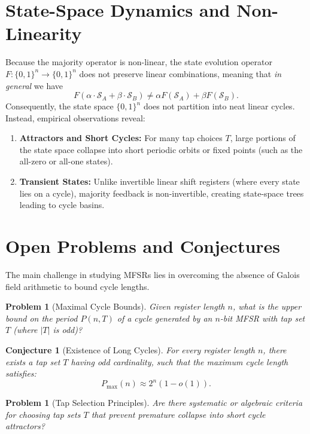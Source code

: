 \documentclass[11pt,reqno]{amsart}
\newtheorem{conjecture}[theorem]{Conjecture}
\newtheorem{problem}[theorem]{Problem}
\theoremstyle{definition}
\begin{document}
\section{State-Space Dynamics and Non-Linearity}

Because the majority operator is non-linear, the state evolution 
operator $F \colon \{0, 1\}^n \to \{0, 1\}^n$ does not 
preserve linear combinations, meaning that {\sl in general} we have
\[
F(\alpha \cdot \mathcal{S}_A + \beta \cdot \mathcal{S}_B) \neq \alpha F(\mathcal{S}_A) + \beta F(\mathcal{S}_B).
\]
Consequently, the state space $\{0, 1\}^n$ does not partition into 
neat linear cycles. Instead, empirical observations reveal:
\begin{enumerate}
    \item {\bf Attractors and Short Cycles:} For many tap choices $T$, large 
	   portions of the state space collapse into short periodic orbits
	or fixed points (such as the all-zero or all-one states).
    \item {\bf Transient States:} Unlike invertible linear shift registers 
	    (where every state lies on a cycle), majority feedback is 
	non-invertible, creating state-space trees leading to cycle basins.
\end{enumerate}

\section{Open Problems and Conjectures}

The main challenge in studying MFSRs lies in overcoming the 
absence of Galois field arithmetic to bound cycle lengths.

\begin{problem}[Maximal Cycle Bounds]
Given register length $n$, what is the upper bound on the period 
	$P(n, T)$ of a cycle generated by an $n$-bit MFSR with tap set $T$ 
	(where $|T|$ is odd)?
\end{problem}

\begin{conjecture}[Existence of Long Cycles]
For every register length $n$, there exists a tap set $T$ having odd cardinality,
	such that the maximum cycle length satisfies:
\[
P_{\max}(n) \approx 2^n(1 - o(1)).
\]
\end{conjecture}

\begin{problem}[Tap Selection Principles]
Are there systematic or algebraic criteria for choosing tap sets $T$ that prevent premature collapse into short cycle attractors?
\end{problem}
\end{document}
